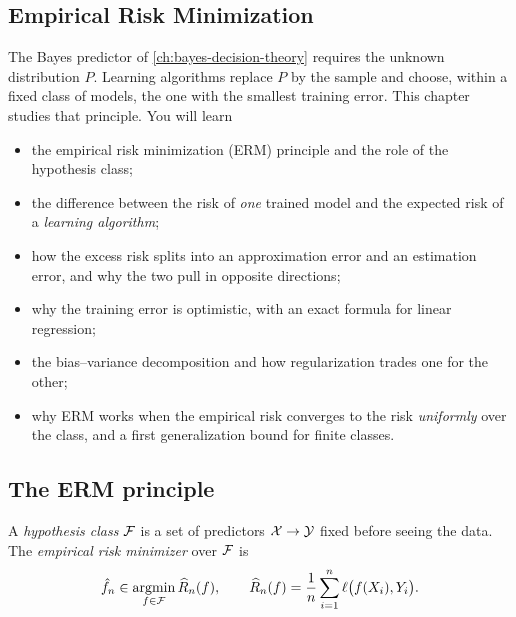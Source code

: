 \begin{notechapter}
\chapter{Empirical Risk Minimization}\label{ch:erm}

\begin{chapterintro}
The Bayes predictor of \cref{ch:bayes-decision-theory} requires the unknown
distribution $P$. Learning algorithms replace $P$ by the sample and choose,
within a fixed class of models, the one with the smallest training error. This
chapter studies that principle. You will learn
\begin{itemize}[nosep]
  \item the empirical risk minimization (ERM) principle and the role of the
        hypothesis class;
  \item the difference between the risk of \emph{one} trained model and the
        expected risk of a \emph{learning algorithm};
  \item how the excess risk splits into an approximation error and an
        estimation error, and why the two pull in opposite directions;
  \item why the training error is optimistic, with an exact formula for
        linear regression;
  \item the bias--variance decomposition and how regularization trades one
        for the other;
  \item why ERM works when the empirical risk converges to the risk
        \emph{uniformly} over the class, and a first generalization bound for
        finite classes.
\end{itemize}
\end{chapterintro}

\section{The ERM principle}\label{erm:sec:principle}

\begin{definition}\label{erm:def:erm}
A \emph{hypothesis class} $\mathcal{F}$ is a set of predictors $\mathcal{X}\to\mathcal{Y}$ fixed before
seeing the data. The \emph{empirical risk minimizer} over $\mathcal{F}$ is
\[
  \hat f_n \in \operatorname*{argmin}_{f \in \mathcal{F}} \widehat{R}_n(f),
  \qquad \widehat{R}_n(f) = \frac1n\sum_{i=1}^n \ell\bigl(f(X_i), Y_i\bigr).
\]
\end{definition}


\end{notechapter}
